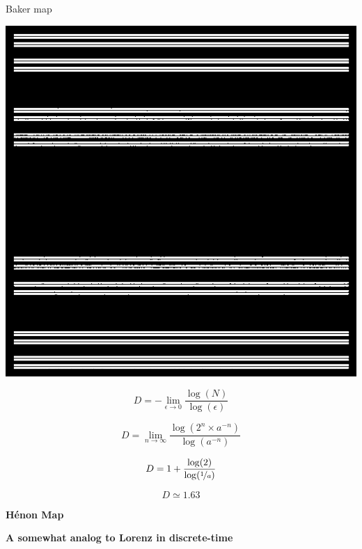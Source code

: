 \documentclass[usenames, dvipsnames, aspectratio=169]{beamer}
\begin{document}
\begin{frame}[t, c]{Baker map}{}
  \vfill
  \large

  \begin{minipage}{.38\textwidth}
    \centering
    \includegraphics[width=\textwidth]{Baker_map_5_bis}
  \end{minipage}%
  \hfill
  \begin{minipage}{.58\textwidth}
    \begin{overprint}
      \[
      D = -\lim_{\epsilon \to 0} \dfrac{\log(N)}{\log(\epsilon)}
      \]

      \[
      D = \lim_{n \to \infty} \dfrac{\log \left(2^n \times a^{-n} \right)}{\log \left( a^{-n} \right)}
      \]

      \[
      D = 1 + \dfrac{\log(2)}{\log(\nicefrac{1}{a})}
      \]

      \[
      D \simeq 1.63
      \]
    \end{overprint}
  \end{minipage}

  \vfill
\end{frame}

{



  \begin{frame}[fragile]{}{}
    \vfill
    \centering
    \Large
    \textbf{\color{black} Hénon Map}

    \bigskip

    \large
    \textbf{\color{gray} A somewhat analog to Lorenz in discrete-time}
    \vfill
  \end{frame}
}
\end{document}
